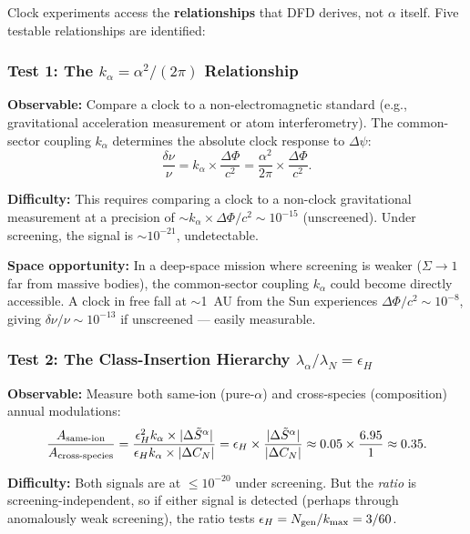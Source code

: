 \documentclass[11pt]{article}
\newcommand{\kalpha}{k_\alpha}
\theoremstyle{definition}
\theoremstyle{remark}
\begin{document}
Clock experiments access the \textbf{relationships} that DFD derives,
not $\alpha$ itself. Five testable relationships are identified:

\subsubsection{Test 1: The $\kalpha = \alpha^2/(2\pi)$ Relationship}

\textbf{Observable:} Compare a clock to a non-electromagnetic standard
(e.g., gravitational acceleration measurement or atom interferometry).
The common-sector coupling $\kalpha$ determines the absolute clock response
to $\Delta\psi$:
\begin{equation}
\frac{\delta\nu}{\nu} = \kalpha \times \frac{\Delta\Phi}{c^2}
= \frac{\alpha^2}{2\pi} \times \frac{\Delta\Phi}{c^2}.
\end{equation}

\textbf{Difficulty:} This requires comparing a clock to a non-clock
gravitational measurement at a precision of $\sim \kalpha \times
\Delta\Phi/c^2 \sim 10^{-15}$ (unscreened). Under screening, the signal
is $\sim 10^{-21}$, undetectable.

\textbf{Space opportunity:} In a deep-space mission where screening is
weaker ($\Sigma \to 1$ far from massive bodies), the common-sector coupling
$\kalpha$ could become directly accessible. A clock in free fall at $\sim$1~AU
from the Sun experiences $\Delta\Phi/c^2 \sim 10^{-8}$, giving
$\delta\nu/\nu \sim 10^{-13}$ if unscreened --- easily measurable.

\subsubsection{Test 2: The Class-Insertion Hierarchy
$\lambda_\alpha / \lambda_N = \epsilon_H$}

\textbf{Observable:} Measure both same-ion (pure-$\alpha$) and
cross-species (composition) annual modulations:
\begin{equation}
\frac{A_{\rm same\text{-}ion}}{A_{\rm cross\text{-}species}}
= \frac{\epsilon_H^2 \kalpha \times |\Delta\tilde{S}^\alpha|}
       {\epsilon_H \kalpha \times |\Delta C_N|}
= \epsilon_H \times \frac{|\Delta\tilde{S}^\alpha|}{|\Delta C_N|}
\approx 0.05 \times \frac{6.95}{1} \approx 0.35.
\end{equation}

\textbf{Difficulty:} Both signals are at $\leq 10^{-20}$ under screening.
But the \emph{ratio} is screening-independent, so if either signal is
detected (perhaps through anomalously weak screening), the ratio tests
$\epsilon_H = N_{\rm gen}/k_{\max} = 3/60$.
\end{document}
